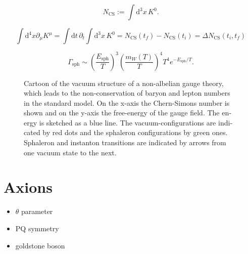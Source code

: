 \documentclass[master,       %
               twoside,        %
               BCOR10mm,       %
               english,ngerman, %
               ]{GAUBM}
\begin{document}
\begin{otherlanguage}{english}
\begin{equation}
	N_{\mathrm{CS}} := \int \mathrm{d}^3 x \, K^0.
\end{equation}

\begin{equation}
	\int \mathrm{d}^4 x \partial_\mu K^\mu = \int \mathrm{d} t \, \partial_t \int \mathrm{d}^3 x \, K^0 =
	N_{\mathrm{CS}}(t_f) - N_{\mathrm{CS}}(t_i) = \Delta N_{\mathrm{CS}}(t_i, t_f)
\end{equation}

\begin{equation}
	\Gamma_{\mathrm{sph}} \sim \left( \frac{E_{\mathrm{sph}}}{T} \right)^3 \left( \frac{m_W(T)}{T} \right)^4 T^4 e^{- E_{\mathrm{sph}} / T}.
\end{equation}

\begin{figure}[H]
	\centering
	\caption{Cartoon of the vacuum structure of a non-albelian gauge theory, which leads to the non-conservation of baryon and lepton numbers in the standard model.
		On the x-axis the Chern-Simons number is shown and on the y-axis the free-energy of the gauge field.
		The energy is sketched as a blue line. The vacuum-configurations are indicated by red dots and the sphaleron configurations by green ones. Sphaleron and instanton transitions are indicated by arrows from one vacuum state
		to the next.
	}
	\label{fig:sphaleron_cartoon}
\end{figure}



\section{Axions}
\begin{itemize}
	\item $\theta$ parameter
	\item PQ symmetry
	\item goldstone boson 
\end{itemize}


\end{otherlanguage}
\end{document}

